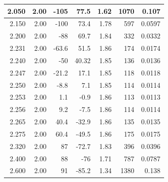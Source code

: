 \documentclass[UTF8]{article}
\begin{document}
\begin{enumerate}
\begin{table}[htbp]
\begin{tabular}{|r|r|r|r|r|r|r|}
            2.050  & 2.00   & -105   & 77.5   & 1.62   & 1070   & 0.107 \\\hline
            2.150  & 2.00   & -100   & 73.4   & 1.78   & 597    & 0.0597 \\\hline
            2.200  & 2.00   & -88    & 69.7   & 1.84   & 332    & 0.0332 \\\hline
            2.231  & 2.00   & -63.6  & 51.5   & 1.86   & 174    & 0.0174 \\\hline
            2.240  & 2.00   & -50    & 40.32  & 1.85   & 136    & 0.0136 \\\hline
            2.247  & 2.00   & -21.2  & 17.1   & 1.85   & 118    & 0.0118 \\\hline
            2.250  & 2.00   & -8.8   & 7.1    & 1.85   & 114    & 0.0114 \\\hline
            2.253  & 2.00   & 1.1    & -0.9   & 1.86   & 113    & 0.0113 \\\hline
            2.256  & 2.00   & 9.2    & -7.5   & 1.86   & 114    & 0.0114 \\\hline
            2.265  & 2.00   & 40.4   & -32.9  & 1.86   & 135    & 0.0135 \\\hline
            2.275  & 2.00   & 60.4   & -49.5  & 1.86   & 175    & 0.0175 \\\hline
            2.320  & 2.00   & 87     & -72.7  & 1.83   & 396    & 0.0396 \\\hline
            2.400  & 2.00   & 88     & -76    & 1.71   & 787    & 0.0787 \\\hline
            2.600  & 2.00   & 91     & -85.2  & 1.34   & 1380   & 0.138 \\\hline


\end{tabular}
\end{table}
\end{enumerate}
\end{document}
